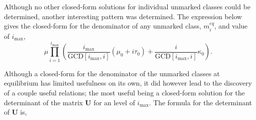 \documentclass[review]{elsarticle}
\newcommand{\imax}{\ensuremath{i_{\max}}\xspace}
\newcommand{\GCD}{\ensuremath{\text{GCD}}\xspace}
\let\bs\boldsymbol
\begin{document}
%
%

Although no other closed-form solutions for individual unmarked classes could be determined, another interesting pattern was determined.
The expression below gives the closed-form for the denominator of any unmarked class, $m_i^{eq}$, and value of \imax,
\begin{equation}\label{eq:anyl_unmarked_denom}
\mu\prod_{i=1}^{\imax}\left(\frac{\imax}{\GCD[\imax,i]}(\mu_0+i\tau_0)+\frac{i}{\GCD[\imax,i]}\kappa_0\right).
\end{equation}

Although a closed-form for the denominator of the unmarked classes at equilibrium has limited usefulness on its own, it did however lead to the discovery of a couple useful relations; the most useful being a closed-form solution for the determinant of the matrix $\bs{U}$ for an level of \imax.
The formula for the determinant of $\bs{U}$ is,
\end{document}
